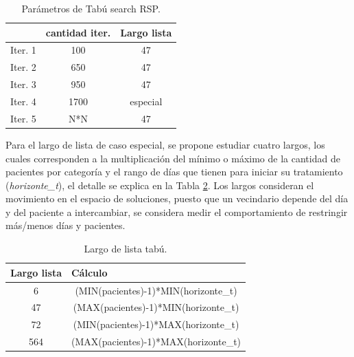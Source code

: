 \documentclass[letter, 10pt]{article}
\begin{document}
\begin{table}[ht]
\centering
\begin{tabular}{l|c|c|}
\cline{2-3}
                              & \multicolumn{1}{l|}{cantidad iter.} & \multicolumn{1}{l|}{Largo lista} \\ \hline
\multicolumn{1}{|l|}{Iter. 1} & 100                                 & 47                          \\ \hline
\multicolumn{1}{|l|}{Iter. 2} & 650                                 & 47                               \\ \hline
\multicolumn{1}{|l|}{Iter. 3} & 950                                 & 47                               \\ \hline
\multicolumn{1}{|l|}{Iter. 4} & 1700                                & especial                                \\ \hline
\multicolumn{1}{|l|}{Iter. 5} & N*N                                 & 47                               \\ \hline
\end{tabular}

\caption{Parámetros de Tabú search RSP.}
\label{table:tc}
\end{table}

Para el largo de lista de caso especial, se propone estudiar cuatro largos, los cuales corresponden a la multiplicación del mínimo o máximo de la cantidad de pacientes por categoría y el rango de días que tienen para iniciar su tratamiento (\textit{horizonte\_t}), el detalle se explica en la Tabla \ref{table:td}. Los largos consideran el movimiento en el espacio de soluciones, puesto que un vecindario depende del día y del paciente a intercambiar, se considera medir el comportamiento de restringir más/menos días y pacientes.

\begin{table}[ht]
\centering
\begin{tabular}{|c|c|}
\hline
\multicolumn{1}{|l|}{Largo lista} & \multicolumn{1}{l|}{Cálculo}        \\ \hline
6                                 & (MIN(pacientes)-1)*MIN(horizonte\_t) \\ \hline
47                                & (MAX(pacientes)-1)*MIN(horizonte\_t) \\ \hline
72                                & (MIN(pacientes)-1)*MAX(horizonte\_t) \\ \hline
564                               & (MAX(pacientes)-1)*MAX(horizonte\_t) \\ \hline
\end{tabular}
\caption{Largo de lista tabú.}
\label{table:td}
\end{table}
\end{document}
